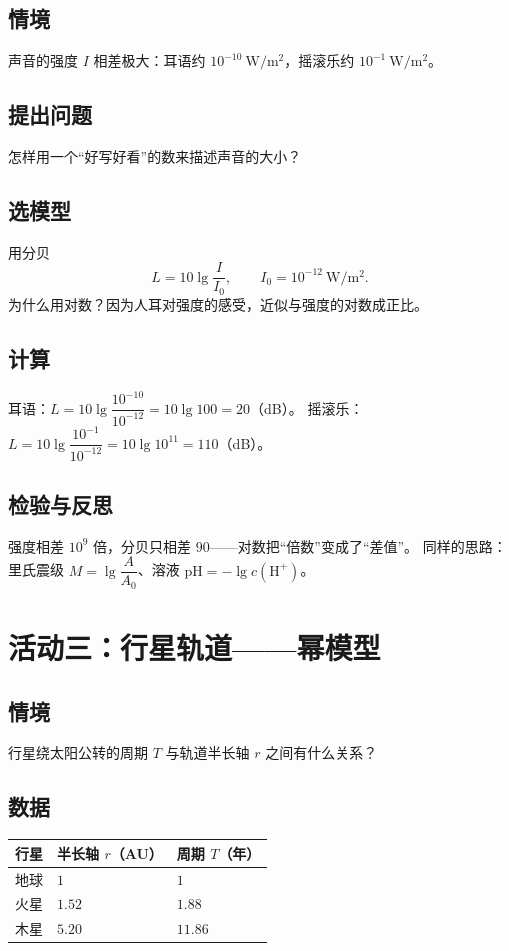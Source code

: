 \subsection{情境}
声音的强度 $I$ 相差极大：耳语约 $10^{-10}\ \mathrm{W/m^2}$，摇滚乐约 $10^{-1}\ \mathrm{W/m^2}$。

\subsection{提出问题}
怎样用一个“好写好看”的数来描述声音的大小？

\subsection{选模型}
用分贝
\[
  L=10\lg\frac{I}{I_0},\qquad I_0=10^{-12}\ \mathrm{W/m^2}.
\]
为什么用对数？因为人耳对强度的感受，近似与强度的对数成正比。

\subsection{计算}
耳语：$L=10\lg\dfrac{10^{-10}}{10^{-12}}=10\lg100=20$（dB）。
摇滚乐：$L=10\lg\dfrac{10^{-1}}{10^{-12}}=10\lg10^{11}=110$（dB）。

\subsection{检验与反思}
强度相差 $10^9$ 倍，分贝只相差 $90$——对数把“倍数”变成了“差值”。
同样的思路：里氏震级 $M=\lg\dfrac{A}{A_0}$、溶液 $\mathrm{pH}=-\lg c(\mathrm{H}^+)$。

\section{活动三：行星轨道——幂模型}

\subsection{情境}
行星绕太阳公转的周期 $T$ 与轨道半长轴 $r$ 之间有什么关系？

\subsection{数据}
\begin{center}
\footnotesize
\setlength{\tabcolsep}{4pt}
\renewcommand{\arraystretch}{1.4}
\begin{tabular}{p{2.4cm}p{3.6cm}p{3.6cm}}
\toprule
行星 & 半长轴 $r$（AU） & 周期 $T$（年） \\
\midrule
地球 & $1$ & $1$ \\
火星 & $1.52$ & $1.88$ \\
木星 & $5.20$ & $11.86$ \\
\bottomrule
\end{tabular}
\end{center}


